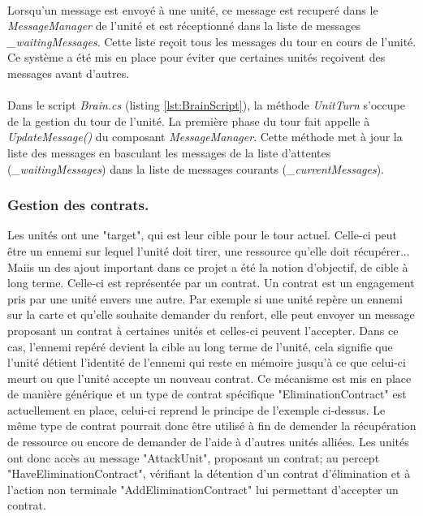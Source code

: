 \documentclass{report}
\begin{document}
\paragraph{}
Lorsqu'un message est envoyé à une unité, ce message est recuperé dans le \textit{MessageManager} de l'unité et est réceptionné dans la liste de messages \textit{\_waitingMessages}. Cette liste reçoit tous les messages du tour en cours de l'unité. Ce système a été mis en place pour éviter que certaines unités reçoivent des messages avant d'autres.
\paragraph{}
Dans le script \textit{Brain.cs} (listing \ref{lst:BrainScript}), la méthode \textit{UnitTurn} s'occupe de la gestion du tour de l'unité. La première phase du tour fait appelle à \textit{UpdateMessage()} du composant \textit{MessageManager}. Cette méthode met à jour la liste des messages en basculant les messages de la liste d'attentes (\textit{\_waitingMessages}) dans la liste de messages courants (\textit{\_currentMessages}).
\subsubsection{Gestion des contrats.}
Les unités ont une "target", qui est leur cible pour le tour actuel. Celle-ci peut être un ennemi sur lequel l'unité doit tirer, une ressource qu'elle doit récupérer...
\newline Maiis un des ajout important dans ce projet a été la notion d'objectif, de cible à long terme. Celle-ci est représentée par un contrat. Un contrat est un engagement pris par une unité envers une autre. Par exemple si une unité repère un ennemi sur la carte et qu'elle souhaite demander du renfort, elle peut envoyer un message proposant un contrat à certaines unités et celles-ci peuvent l'accepter. Dans ce cas, l'ennemi repéré devient la cible au long terme de l'unité, cela signifie que l'unité détient l'identité de l'ennemi qui reste en mémoire jusqu'à ce que celui-ci meurt ou que l'unité accepte un nouveau contrat. Ce mécanisme est mis en place de manière générique et un type de contrat spécifique "EliminationContract" est actuellement en place, celui-ci reprend le principe de l'exemple ci-dessus. Le même type de contrat pourrait donc être utilisé à fin de demender la récupération de ressource ou encore de demander de l'aide à d'autres unités alliées. Les unités ont donc accès au message "AttackUnit", proposant un contrat; au percept "HaveEliminationContract", vérifiant la détention d'un contrat d'élimination et à l'action non terminale "AddEliminationContract" lui permettant d'accepter un contrat.     
\end{document}
